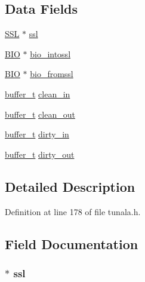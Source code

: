\subsection*{Data Fields}
\begin{DoxyCompactItemize}
\item 
\hyperlink{crypto_2ossl__typ_8h_a71f21e09bf365489dab9d85bd4785e24}{S\+SL} $\ast$ \hyperlink{struct__state__machine__t_ae7c0417fa2881f3546920311fee80311}{ssl}
\item 
\hyperlink{crypto_2bio_2bio_8h_af3fabae1c9af50b9312cdff41e11d1dd}{B\+IO} $\ast$ \hyperlink{struct__state__machine__t_aa82e4324e7b8fc27368e12016caf7329}{bio\+\_\+intossl}
\item 
\hyperlink{crypto_2bio_2bio_8h_af3fabae1c9af50b9312cdff41e11d1dd}{B\+IO} $\ast$ \hyperlink{struct__state__machine__t_a0c6b12b33981bb9454af44e80d528fea}{bio\+\_\+fromssl}
\item 
\hyperlink{tunala_8h_a1ca7ebe52bb67d6b38a88cc0449bc5a1}{buffer\+\_\+t} \hyperlink{struct__state__machine__t_aec14c3bd6f1633df4acf8a8196e5028c}{clean\+\_\+in}
\item 
\hyperlink{tunala_8h_a1ca7ebe52bb67d6b38a88cc0449bc5a1}{buffer\+\_\+t} \hyperlink{struct__state__machine__t_ab22987adaef1c06b920f04a14de9b31e}{clean\+\_\+out}
\item 
\hyperlink{tunala_8h_a1ca7ebe52bb67d6b38a88cc0449bc5a1}{buffer\+\_\+t} \hyperlink{struct__state__machine__t_a087e59ab12b72ec4e9df647c90d2b29b}{dirty\+\_\+in}
\item 
\hyperlink{tunala_8h_a1ca7ebe52bb67d6b38a88cc0449bc5a1}{buffer\+\_\+t} \hyperlink{struct__state__machine__t_a99e2f9c81dd49292bb417d57cf2b50a9}{dirty\+\_\+out}
\end{DoxyCompactItemize}


\subsection{Detailed Description}


Definition at line 178 of file tunala.\+h.



\subsection{Field Documentation}
\subsubsection[{\texorpdfstring{ssl}{ssl}}]{$\ast$ ssl}\hypertarget{struct__state__machine__t_ae7c0417fa2881f3546920311fee80311}{}\label{struct__state__machine__t_ae7c0417fa2881f3546920311fee80311}


